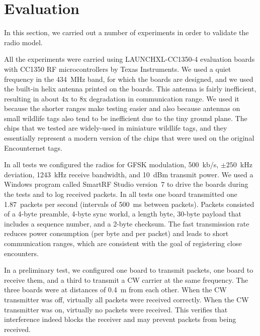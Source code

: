 \section{Evaluation}
\label{sectionsimulation}
In this section, we carried out a number of experiments in order to validate the radio model. 

All the experiments were carried using LAUNCHXL-CC1350-4 evaluation boards with CC1350 RF microcontrollers 
by Texas Instruments. We used a quiet frequency in the 434~MHz band, for which the boards are designed,
and we used the built-in helix antenna printed on the boards. This antenna is fairly inefficient, resulting
in about 4x to 8x degradation in communication range. We used it because the shorter 
ranges make testing easier
and also because antennas on small wildlife tags also tend to be inefficient due to the tiny ground plane.
The chips that we tested are widely-used in miniature wildlife tags, and they essentially represent a modern
version of the chips that were used on the original Encounternet tags.

In all tests we configured the radios for GFSK modulation, 500~kb/s, $\pm 250$~kHz deviation, 1243~kHz receive bandwidth,
and 10~dBm transmit power. We used a Windows program called SmartRF Studio version~7 to drive the boards during
the tests and to log received packets. In all tests one board transmitted one 1.87~packets per second (intervals of
500~ms between packets). Packets consisted of a 4-byte preamble, 4-byte sync workd, a length byte, 30-byte payload 
that includes a sequence number, and a 2-byte checksum. The fast transmission rate reduces power consumption (per byte and
per packet) and leads to short communication ranges, which are consistent with the goal of registering close encounters.

In a preliminary test, we configured one board to transmit packets, one board to receive them, and a third to transmit a 
CW carrier at the same frequency. The three boards were at distances of 0.4~m from each other. When the CW transmitter
was off, virtually all packets were received correctly. When the CW transmitter was on, virtually no packets were received.
This verifies that interference indeed blocks the receiver and may prevent packets from being received.

